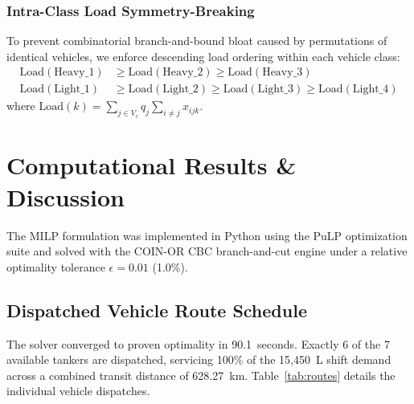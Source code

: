 \documentclass[11pt,a4paper]{article}
\begin{document}
\subsubsection{Intra-Class Load Symmetry-Breaking}
To prevent combinatorial branch-and-bound bloat caused by permutations of identical vehicles, we enforce descending load ordering within each vehicle class:
\begin{align}
\text{Load}(\text{Heavy\_1}) &\ge \text{Load}(\text{Heavy\_2}) \ge \text{Load}(\text{Heavy\_3}) \\
\text{Load}(\text{Light\_1}) &\ge \text{Load}(\text{Light\_2}) \ge \text{Load}(\text{Light\_3}) \ge \text{Load}(\text{Light\_4})
\end{align}
where $\text{Load}(k) = \sum_{j \in V_c} q_j \sum_{i \neq j} x_{ijk}$.

\section{Computational Results \& Discussion}

The MILP formulation was implemented in Python using the PuLP optimization suite and solved with the COIN-OR CBC branch-and-cut engine under a relative optimality tolerance $\epsilon = 0.01$ (1.0\%).

\subsection{Dispatched Vehicle Route Schedule}
The solver converged to proven optimality in 90.1~seconds. Exactly 6 of the 7 available tankers are dispatched, servicing 100\% of the 15,450~L shift demand across a combined transit distance of 628.27~km. Table~\ref{tab:routes} details the individual vehicle dispatches.
\end{document}
